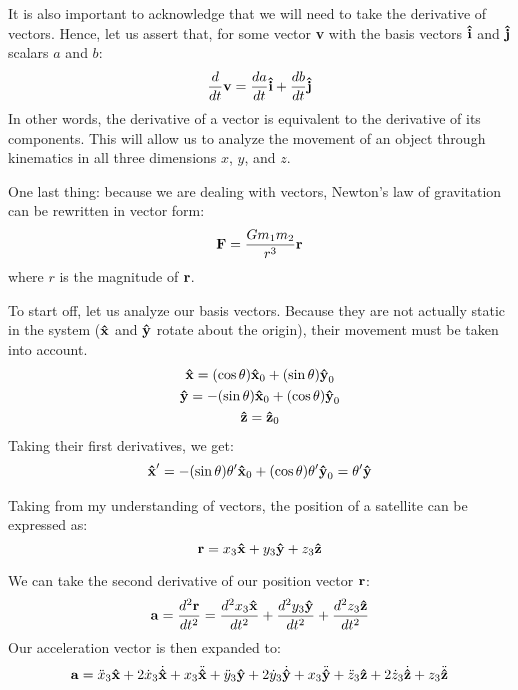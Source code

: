 It is also important to acknowledge that we will need to take the derivative of vectors. Hence, let us assert that, for some vector \textbf{v} with the basis vectors $\uvec{i}$ and $\uvec{j}$ scalars $a$ and $b$:
\begin{equation*}
	\frac{d}{dt}\bvec{v} = \frac{da}{dt}\uvec{i} + \frac{db}{dt}\uvec{j}
\end{equation*}
In other words, the derivative of a vector is equivalent to the derivative of its components.
This will allow us to analyze the movement of an object through kinematics in all three dimensions $x$, $y$, and $z$.

\newpage

One last thing: because we are dealing with vectors, Newton's law of gravitation can be rewritten in vector form:
\begin{equation*}
	\bm{\mathbf{F}} = \frac{Gm_1m_2}{r^3}\bm{\mathbf{r}}
\end{equation*}
where $r$ is the magnitude of $\bm{\mathbf{r}}$.

To start off, let us analyze our basis vectors. Because they are not actually static in the system ($\uvec{x}$ and $\uvec{y}$ rotate about the origin), their movement must be taken into account.
\begin{gather*}
	\uvec{x} = (\cos\theta)\uvec{x}_0 + (\sin\theta)\uvec{y}_0 \\
	\uvec{y} = -(\sin\theta)\uvec{x}_0 + (\cos\theta)\uvec{y}_0 \\
	\uvec{z} = \uvec{z}_0
\end{gather*}
Taking their first derivatives, we get:
\begin{gather*}
	\uvec{x}' = -(\sin\theta)\theta'\uvec{x}_0 + (\cos\theta)\theta'\uvec{y}_0 = \theta'\uvec{y}
\end{gather*}

Taking from my understanding of vectors, the position of a satellite can be expressed as:
\begin{equation*}
	\bvec{r} = x_3\uvec{x} + y_3\uvec{y} + z_3\uvec{z}
\end{equation*}

We can take the second derivative of our position vector $\bm{\mathbf{r}}$:
\begin{equation*}
	\bvec{a} = \frac{d^2\bvec{r}}{dt^2} = \frac{d^2x_3\uvec{x}}{dt^2} + \frac{d^2y_3\uvec{y}}{dt^2} + \frac{d^2z_3\uvec{z}}{dt^2}
\end{equation*}
Our acceleration vector is then expanded to:
\begin{equation*}
	\bvec{a} = \ddot{x}_3\uvec{x} + 2\dot{x}_3\dot{\uvec{x}} + x_3\ddot{\uvec{x}} + \ddot{y}_3\uvec{y} + 2\dot{y}_3\dot{\uvec{y}} + x_3\ddot{\uvec{y}} + \ddot{z}_3\uvec{z} + 2\dot{z}_3\dot{\uvec{z}} + z_3\ddot{\uvec{z}}
\end{equation*}
